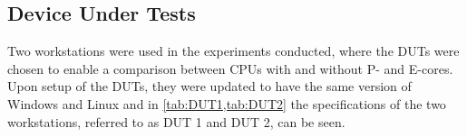 
\subsection{Device Under Tests}

Two workstations were used in the experiments conducted, where the DUTs were chosen to enable a comparison between CPUs with and without P- and E-cores. Upon setup of the DUTs, they were updated to have the same version of Windows and Linux and in \cref {tab:DUT1,tab:DUT2} the specifications of the two workstations, referred to as DUT 1 and DUT 2, can be seen. 





